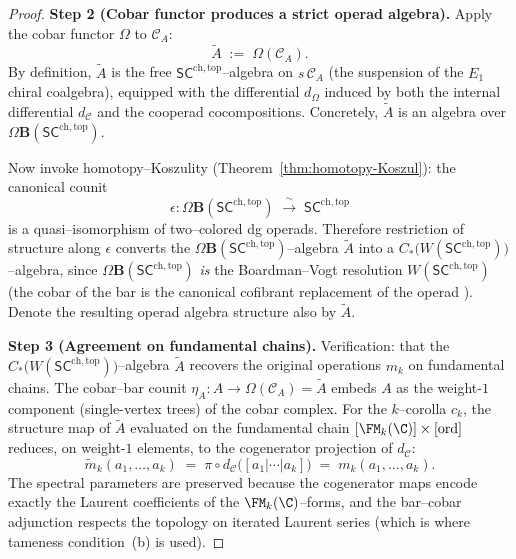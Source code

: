 \begin{proof}
\medskip
\textbf{Step 2 (Cobar functor produces a strict operad algebra).}
Apply the cobar functor $\Omega$ to $\mathcal{C}_A$:
\[
 \widetilde{A} \;:=\; \Omega(\mathcal{C}_A).
\]
By definition, $\widetilde{A}$ is the free
$\mathsf{SC}^{\mathrm{ch,top}}$--algebra on $s\,\mathcal{C}_A$
(the suspension of the $E_1$ chiral coalgebra), equipped with the
differential $d_\Omega$ induced by both the internal differential
$d_{\mathcal{C}}$ and the cooperad cocompositions. Concretely,
$\widetilde{A}$ is an algebra over
$\Omega\mathbf{B}(\mathsf{SC}^{\mathrm{ch,top}})$.

Now invoke homotopy--Koszulity
(Theorem~\ref{thm:homotopy-Koszul}): the canonical counit
\[
 \epsilon \colon
 \Omega\mathbf{B}(\mathsf{SC}^{\mathrm{ch,top}})
 \;\xrightarrow{\;\sim\;}\;
 \mathsf{SC}^{\mathrm{ch,top}}
\]
is a quasi--isomorphism of two--colored dg operads. Therefore
restriction of structure along $\epsilon$ converts the
$\Omega\mathbf{B}(\mathsf{SC}^{\mathrm{ch,top}})$--algebra
$\widetilde{A}$ into a
$C_\ast\!\bigl(W(\mathsf{SC}^{\mathrm{ch,top}})\bigr)$--algebra,
since $\Omega\mathbf{B}(\mathsf{SC}^{\mathrm{ch,top}})$
\emph{is} the Boardman--Vogt resolution
$W(\mathsf{SC}^{\mathrm{ch,top}})$ (the cobar of the bar is
the canonical cofibrant replacement of the operad \cite{BM03}).
Denote the resulting operad algebra structure also by
$\widetilde{A}$.

\medskip
\textbf{Step 3 (Agreement on fundamental chains).}
Verification: that the $C_\ast\!\bigl(W(\mathsf{SC}^{\mathrm{ch,top}})\bigr)$--algebra
$\widetilde{A}$ recovers the original operations $m_k$ on
fundamental chains. The cobar--bar counit
$\eta_A \colon A \to \Omega(\mathcal{C}_A) = \widetilde{A}$
embeds $A$ as the weight-$1$ component (single-vertex trees)
of the cobar complex. For the $k$--corolla $c_k$, the
structure map of $\widetilde{A}$ evaluated on the fundamental
chain $[\FM_k(\C)] \times [\mathrm{ord}]$ reduces, on
weight-$1$ elements, to the cogenerator projection of
$d_{\mathcal{C}}$:
\[
 \widetilde{m}_k(a_1, \ldots, a_k)
 \;=\; \pi \circ d_{\mathcal{C}}
 \bigl([a_1 | \cdots | a_k]\bigr)
 \;=\; m_k(a_1, \ldots, a_k).
\]
The spectral parameters are preserved because the
cogenerator maps encode exactly the Laurent coefficients of
the $\FM_k(\C)$--forms, and the bar--cobar adjunction respects
the topology on iterated Laurent series (which is where
tameness condition~(b) is used).


\end{proof}
